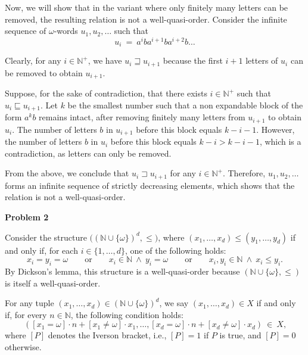 \documentclass[12pt]{article}
\begin{document}
	\medskip
	
	Now, we will show that in the variant where only finitely many letters can
	be removed, the resulting relation is not a well-quasi-order. Consider the
	infinite sequence of \(\omega\)-words \(u_{1}, u_{2}, \ldots\) such that
	\[ u_{i} \ = \ a^{i} b a^{i + 1} b a^{i + 2} b \ldots \]
	
	Clearly, for any \(i \in \mathbb{N}^{+}\), we have \(u_{i} \sqsupseteq
	u_{i + 1}\) because the first \(i + 1\) letters of \(u_{i}\) can be removed
	to obtain \(u_{i + 1}\).
	
	\medskip
	
	Suppose, for the sake of contradiction, that there exists \(i \in
	\mathbb{N}^{+}\) such that \(u_{i} \sqsubseteq u_{i + 1}\). Let \(k\) be the
	smallest number such that a non expandable block of the form \(a^{k} b\)
	remains intact, after removing finitely many letters from \(u_{i + 1}\) to
	obtain \(u_{i}\). The number of letters \(b\) in \(u_{i + 1}\) before this
	block equals \(k - i - 1\). However, the number of letters \(b\) in
	\(u_{i}\) before this block equals \(k - i > k - i - 1\), which is a
	contradiction, as letters can only be removed.
	
	\medskip
	
	From the above, we conclude that \(u_{i} \sqsupset u_{i + 1}\) for any \(i
	\in \mathbb{N}^{+}\). Therefore, \(u_{1}, u_{2}, \ldots\) forms an infinite
	sequence of strictly decreasing elements, which shows that the relation is
	not a well-quasi-order.
	
	\bigskip
	
	\textbf{Problem 2}
	
	\medskip
	
	Consider the structure \(\big( (\mathbb{N} \cup \{\omega\})^{d}, \leqslant
	\! \big)\), where \((x_{1}, \ldots, x_{d}) \leqslant (y_{1}, \ldots,
	y_{d})\) if and only if, for each \(i \in \{1, \ldots, d\}\), one of the
	following holds:
	\[ x_{i} = y_{i} = \omega \qquad \text{or} \qquad x_{i} \in \mathbb{N} \
	\wedge \ y_{i} = \omega \qquad \text{or} \qquad x_{i}, y_{i} \in \mathbb{N}
	\ \wedge \ x_{i} \leqslant y_{i} \text{.} \]
	By Dickson's lemma, this structure is a well-quasi-order because
	\((\mathbb{N} \cup \{\omega\}, \leqslant)\) is itself a well-quasi-order.
	
	\medskip
	
	For any tuple \((x_{1}, \ldots, x_{d}) \in (\mathbb{N} \cup
	\{\omega\})^{d}\), we say \((x_{1}, \ldots, x_{d}) \in X\) if and only if,
	for every \(n \in \mathbb{N}\), the following condition holds:
	\[ ([x_{1} = \omega] \cdot n + [x_{1} \neq \omega] \cdot x_{1}, \ldots,
	[x_{d} = \omega] \cdot n + [x_{d} \neq \omega] \cdot x_{d}) \ \in \ X
	\text{,} \]
	where \([P]\) denotes the Iverson bracket, i.e., \([P] = 1\) if \(P\) is
	true, and \([P] = 0\) otherwise.
	
\end{document}
